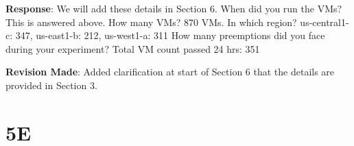\documentclass{article}
\newcommand{\resp}[1]{\textbf{Response}: #1}
\newcommand{\revmade}[1]{\textbf{Revision Made}: #1}
\begin{document}
\begin{enumerate}
\resp{We will add these details in Section 6.
When did you run the VMs? This is answered above.
How many VMs? 870 VMs.
In which region? us-central1-c: 347, us-east1-b: 212, us-west1-a: 311
How many preemptions did you face during your experiment? Total VM count passed 24 hrs: 351
}


\revmade{Added clarification at start of Section 6 that the details are provided in Section 3.}

\end{enumerate}

\section{5E}
\end{document}
